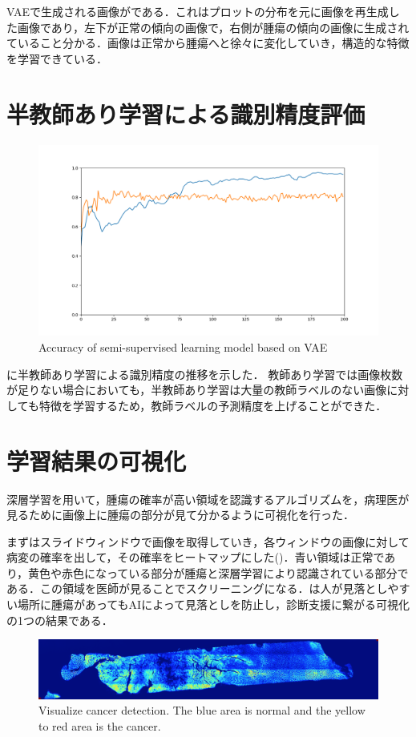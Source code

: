 VAEで生成される画像がである．これはプロットの分布を元に画像を再生成した画像であり，左下が正常の傾向の画像で，右側が腫瘍の傾向の画像に生成されていること分かる．画像は正常から腫瘍へと徐々に変化していき，構造的な特徴を学習できている．


\section{半教師あり学習による識別精度評価}

\begin{figure}[H]
	\centering
	\includegraphics[width=0.8\linewidth]{fig/chapter4/accuracy_summary}
	\caption{Accuracy of semi-supervised learning model based on VAE}
	\label{fig:semiVAE_acc}
\end{figure}

に半教師あり学習による識別精度の推移を示した．
教師あり学習では画像枚数が足りない場合においても，半教師あり学習は大量の教師ラベルのない画像に対しても特徴を学習するため，教師ラベルの予測精度を上げることができた．


\section{学習結果の可視化}
深層学習を用いて，腫瘍の確率が高い領域を認識するアルゴリズムを，病理医が見るために画像上に腫瘍の部分が見て分かるように可視化を行った．

まずはスライドウィンドウで画像を取得していき，各ウィンドウの画像に対して病変の確率を出して，その確率をヒートマップにした()．青い領域は正常であり，黄色や赤色になっている部分が腫瘍と深層学習により認識されている部分である．この領域を医師が見ることでスクリーニングになる．は人が見落としやすい場所に腫瘍があってもAIによって見落としを防止し，診断支援に繋がる可視化の1つの結果である．

\begin{figure}[H]
	\centering
	\includegraphics[width=\linewidth]{fig/chapter4/visualization/sample_B}
	\caption{Visualize cancer detection. The blue area is normal and the yellow to red area is the cancer.}
	\label{fig:cancer_detect_sampleB}
\end{figure}

